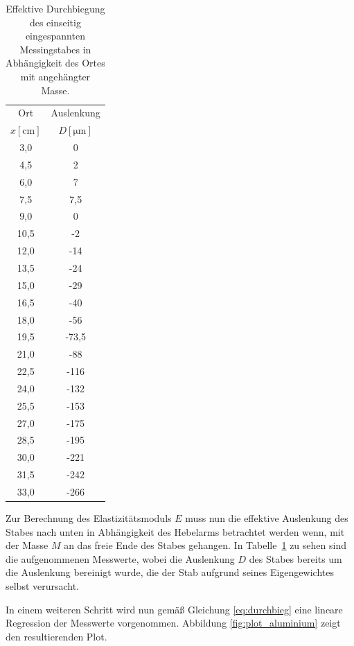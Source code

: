 \documentclass[
  bibliography=totoc,     %
  captions=tableheading,  %
  titlepage=firstiscover, %
]{scrartcl}
\begin{document}
\begin{table}[H]
    \centering
    \caption{Effektive Durchbiegung des einseitig eingespannten Messingstabes in Abhängigkeit des Ortes mit angehängter Masse.}
    \begin{tabular}{cc}
        \toprule
        {Ort} & {Auslenkung} \\
        {$x[\si{\centi\metre}]$} & {$D[\si{\micro\metre}]$} \\
        \midrule
         3,0 &    0 \\
         4,5 &    2 \\
         6,0 &    7 \\
         7,5 &  7,5 \\
         9,0 &    0 \\
        10,5 &   -2 \\
        12,0 &  -14 \\
        13,5 &  -24 \\
        15,0 &  -29 \\
        16,5 &  -40 \\
        18,0 &  -56 \\
        19,5 &-73,5 \\
        21,0 &  -88 \\
        22,5 & -116 \\
        24,0 & -132 \\
        25,5 & -153 \\
        27,0 & -175 \\
        28,5 & -195 \\
        30,0 & -221 \\
        31,5 & -242 \\
        33,0 & -266 \\
        \bottomrule
    \end{tabular}
    \label{tab2:messing}
\end{table}
Zur Berechnung des Elastizitätsmoduls $E$ muss nun die effektive Auslenkung des
Stabes nach unten in Abhängigkeit des Hebelarms betrachtet werden wenn, mit der
Masse $M$ an das freie Ende des Stabes gehangen. In Tabelle~\ref{tab2:messing}
zu sehen sind die aufgenommenen Messwerte, wobei die Auslenkung $D$ des Stabes
bereits um die Auslenkung bereinigt wurde, die der Stab aufgrund seines Eigengewichtes
selbst verursacht.

In einem weiteren Schritt wird nun gemäß Gleichung \ref{eq:durchbieg} eine
lineare Regression der Messwerte vorgenommen. Abbildung \ref{fig:plot_aluminium}
zeigt den resultierenden Plot.
\end{document}
